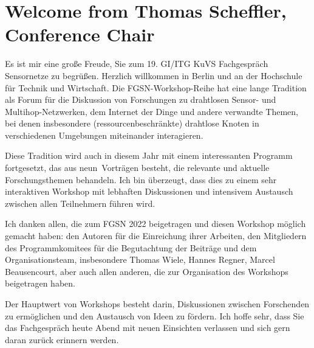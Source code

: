 \documentclass[a4paper,%
  10pt,%
  oneside,%
  onesidepapers,%
  electronic,%
  binding=0mm,%
  papers=countpages,%
  headers=allpages,%
  bib=backref,%
  paperselec=all,%
  onecoltoc,%
  tocnum=right,%
  twocolbib,%
  twocolindex,%
  checktitle=false,%
  checkauthor=false,%
  showpapernumber=false,%
  movepagenumber=true,%
  showmarginlines=false,%
  colorheaders=black,%
  debug=false,%
  verbose=false,%
  pdftk=false,%
  geometry={text={175truemm,226truemm},%
    inner=0.69in,top=23.9mm,bottom=38mm,footskip=10.4mm,voffset=-2.8mm},%
  ]{confproc_22}
\begin{document}

\otherpagestyle
\clearsingleordoublepage
\vspace*{0.6cm}
\thisotherpagestyle
{}
\section*{Welcome from Thomas Scheffler, Conference Chair}
\vspace*{0.8cm}
\onehalfspace
\begin{center}
  \begin{minipage}[h]{14cm}
    Es ist mir eine große Freude, Sie zum 19. GI/ITG KuVS Fachgespräch Sensornetze zu begrüßen.
Herzlich willkommen in Berlin und an der Hochschule für Technik und Wirtschaft.
Die FGSN-Workshop-Reihe hat eine lange Tradition als Forum für die Diskussion von Forschungen zu drahtlosen Sensor- und Multihop-Netzwerken, dem Internet der Dinge und andere verwandte Themen, bei denen insbesondere (ressourcenbeschränkte) drahtlose Knoten in verschiedenen Umgebungen miteinander interagieren. 

Diese Tradition wird auch in diesem Jahr mit einem interessanten Programm fortgesetzt, das aus neun~Vorträgen besteht, die relevante und aktuelle Forschungsthemen behandeln. 
Ich bin überzeugt, dass dies zu einem sehr interaktiven Workshop mit lebhaften Diskussionen und intensivem Austausch zwischen allen Teilnehmern führen wird.

Ich danken allen, die zum FGSN 2022 beigetragen und diesen Workshop möglich gemacht haben: den Autoren für die Einreichung ihrer Arbeiten, den Mitgliedern des Programmkomitees für die Begutachtung der Beiträge und dem Organisationsteam, insbesondere Thomas Wiele, Hannes Regner, Marcel Beausencourt, aber auch allen anderen, die zur Organisation des Workshops beigetragen haben.

Der Hauptwert von Workshops besteht darin, Diskussionen zwischen Forschenden zu ermöglichen und den Austausch von Ideen zu fördern.
Ich hoffe sehr, dass Sie das Fachgespräch heute Abend mit neuen Einsichten verlassen und sich gern daran zurück erinnern werden.
  \end{minipage}
\end{center}
\singlespace
\vspace*{0.6cm}
\thisotherpagestyle
{}
\end{document}
